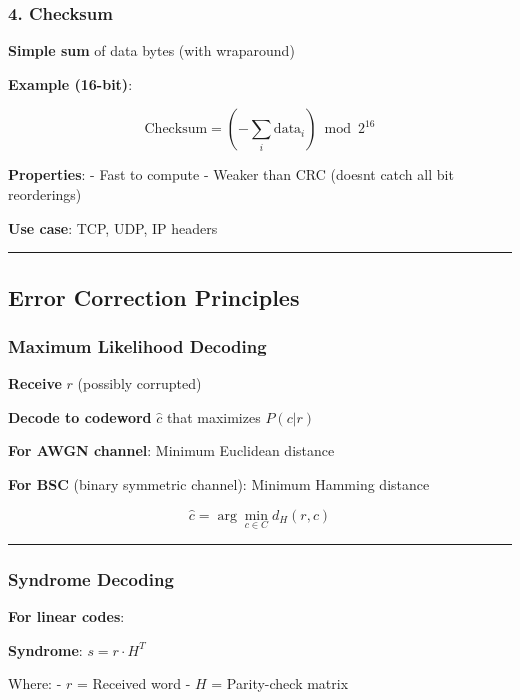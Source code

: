 \subsubsection{4. Checksum}\label{checksum}

\textbf{Simple sum} of data bytes (with wraparound)

\textbf{Example (16-bit)}:

\[
\text{Checksum} = \left(-\sum_{i} \text{data}_i\right) \bmod 2^{16}
\]

\textbf{Properties}: - Fast to compute - Weaker than CRC
(doesn\textquotesingle t catch all bit reorderings)

\textbf{Use case}: TCP, UDP, IP headers

\begin{center}\rule{0.5\linewidth}{0.5pt}\end{center}

\subsection{Error Correction
Principles}\label{error-correction-principles}

\subsubsection{Maximum Likelihood
Decoding}\label{maximum-likelihood-decoding}

\textbf{Receive} \(r\) (possibly corrupted)

\textbf{Decode to codeword} \(\hat{c}\) that maximizes \(P(c | r)\)

\textbf{For AWGN channel}: Minimum Euclidean distance

\textbf{For BSC} (binary symmetric channel): Minimum Hamming distance

\[
\hat{c} = \arg\min_{c \in C} d_H(r, c)
\]

\begin{center}\rule{0.5\linewidth}{0.5pt}\end{center}

\subsubsection{Syndrome Decoding}\label{syndrome-decoding}

\textbf{For linear codes}:

\textbf{Syndrome}: \(s = r \cdot H^T\)

Where: - \(r\) = Received word - \(H\) = Parity-check matrix

